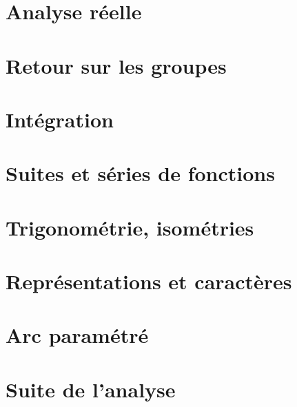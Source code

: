 \chapter{Analyse réelle}








\chapter{Retour sur les groupes}




\chapter{Intégration}









\chapter{Suites et séries de fonctions}





\chapter{Trigonométrie, isométries}




\chapter{Représentations et caractères}


\chapter{Arc paramétré}



\chapter{Suite de l'analyse}





